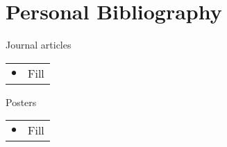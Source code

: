 \documentclass[\main/dresen_thesis.tex]{subfiles}
\begin{document}
	\section*{Personal Bibliography}

	\noindent Journal articles
	\begin{table}[H]
			\begin{tabular}{p{0.2cm}l}
				$\bullet$			& Fill \\


			\end{tabular}%
	\end{table}%

	\vspace{\baselineskip}

	\noindent Posters
	\begin{table}[htbp]
		\begin{tabular}{p{0.2cm}l}
			$\bullet$			& Fill\\



		\end{tabular}
	\end{table}%
\end{document}
